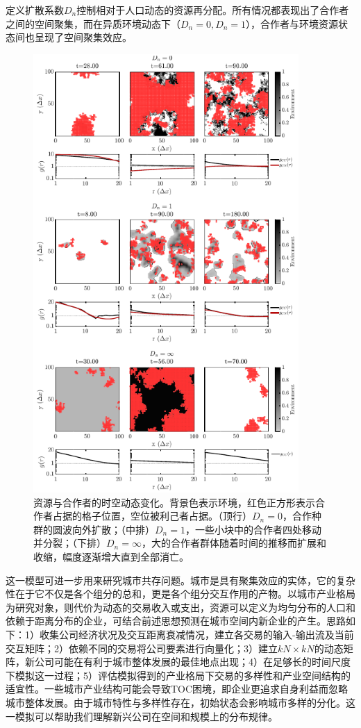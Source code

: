 定义扩散系数$D_n$控制相对于人口动态的资源再分配。所有情况都表现出了合作者之间的空间聚集，而在异质环境动态下（$D_n=0, D_n=1$），合作者与环境资源状态间也呈现了空间聚集效应。
\begin{figure}
	\label{conevol}
	\centering
	\includegraphics[width=0.9\textwidth]{pictures/D_N}
	\caption{资源与合作者的时空动态变化。背景色表示环境，红色正方形表示合作者占据的格子位置，空位被利己者占据。（顶行）$D_n=0$，合作种群的圆波向外扩散；（中排）$D_n=1$，一些小块中的合作者四处移动并分裂；（下排）$D_n=\infty$，大的合作者群体随着时间的推移而扩展和收缩，幅度逐渐增大直到全部消亡。}
\end{figure}

这一模型可进一步用来研究城市共存问题。城市是具有聚集效应的实体，它的复杂性在于它不仅是各个组分的总和，更是各个组分交互作用的产物。以城市产业格局为研究对象，则代价为动态的交易收入或支出，资源可以定义为均匀分布的人口和依赖于距离分布的企业，可结合前述思想预测在城市空间内新企业的产生。思路如下：1）收集公司经济状况及交互距离衰减情况，建立各交易的输入-输出流及当前交互矩阵；2）依赖不同的交易将公司要素进行向量化；3）建立$kN\times kN$的动态矩阵，新公司可能在有利于城市整体发展的最佳地点出现；4）在足够长的时间尺度下模拟这一过程；5）评估模拟得到的产业格局下交易的多样性和产业空间结构的适宜性。一些城市产业结构可能会导致TOC困境，即企业更追求自身利益而忽略城市整体发展。由于城市特性与多样性存在，初始状态会影响城市多样的分化。这一模拟可以帮助我们理解新兴公司在空间和规模上的分布规律。